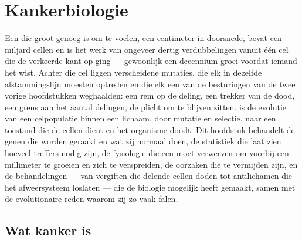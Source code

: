 \chapter{Kankerbiologie}\label{ch:b3:cancer-biology}

Een  die groot genoeg is om te voelen, een centimeter in
doorsnede, bevat een miljard cellen en is het werk van ongeveer dertig
verdubbelingen vanuit één cel die de verkeerde kant op ging ---
gewoonlijk een decennium groei voordat iemand het wist. Achter die cel
liggen verscheidene mutaties, die elk in dezelfde afstammingslijn
moesten optreden en die elk een van de besturingen van de twee vorige
hoofdstukken weghaalden: een rem op de deling, een trekker van de dood,
een grens aan het aantal delingen, de plicht om te blijven zitten.
 is de evolutie van een celpopulatie binnen een lichaam, door
mutatie en selectie, naar een toestand die de cellen dient en het
organisme doodt. Dit hoofdstuk behandelt de genen die worden geraakt en
wat zij normaal doen, de statistiek die laat zien hoeveel treffers
nodig zijn, de fysiologie die een  moet verwerven om voorbij een
millimeter te groeien en zich te verspreiden, de oorzaken die te
vermijden zijn, en de behandelingen --- van vergiften die delende
cellen doden tot antilichamen die het afweersysteem loslaten --- die de
biologie mogelijk heeft gemaakt, samen met de evolutionaire reden
waarom zij zo vaak falen.

\section{Wat kanker is}


